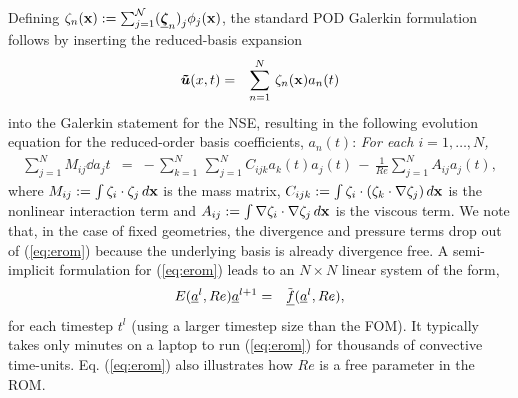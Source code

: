 Defining $\mathbf{\zeta}_n(\mathbf{x}) := \sum_{j=1}^{{\cal N}} (\mbox{\boldmath $ \underline \zeta $}_n)^{}_j \phi_j(\mathbf{x})$, 
the standard POD Galerkin formulation follows by inserting the reduced-basis
expansion
\\[-6.5ex]
\begin{eqnarray} \nonumber
{\mbox{\boldmath $ \tilde u $}}(x,t) &=& \sum_{n=1}^N \, \mathbf{\zeta}_n(\mathbf{x}) a_n(t)  \\[-3.3ex] \nonumber
\end{eqnarray}
into the Galerkin statement for the NSE, resulting in the following
evolution equation for the reduced-order basis coefficients, $a_n(t)$:
{\em For each $i=1,\dots,N$,} \\[-3.3ex]
\begin{eqnarray} \label{eq:erom}
\sum_{j=1}^N M_{ij} \dd{a_j}{t} &=&
- \, \sum_{k=1}^N \, \sum_{j=1}^N C_{ijk} a_k(t) a_j(t) 
\,-\, \frac{1}{Re} \sum_{j=1}^N A_{ij} a_j(t),
\end{eqnarray}
where 
$M_{ij} := \int \mathbf{\zeta}_i \cdot \mathbf{\zeta}_j  \, d\mathbf{x}$ is the mass matrix,
$C_{ijk} := \int \mathbf{\zeta}_i \cdot ( \mathbf{\zeta}_k \cdot \nabla \mathbf{\zeta}_j) \, d\mathbf{x}$
is the nonlinear interaction term and 
$A_{ij} := \int \nabla \mathbf{\zeta}_i \cdot \nabla \mathbf{\zeta}_j \, d\mathbf{x}$
is the viscous term.  We note that, in the case of fixed geometries, 
the divergence and pressure terms drop out of (\ref{eq:erom}) because
the underlying basis is already divergence free.
   A semi-implicit formulation for (\ref{eq:erom}) leads to an $N \times N$
linear system of the form,
\begin{eqnarray} \label{eq:eromd}
E({\underline a}^l,Re) {\underline a}^{l+1} &=& {\tilde {\underline f}} ({\underline a}^l,Re),
\end{eqnarray}
for each timestep $t^l$ (using a larger timestep size than the FOM).
It typically takes only minutes on a laptop to run
(\ref{eq:erom}) for thousands of convective time-units.
Eq. (\ref{eq:erom}) also illustrates how $Re$ is a free parameter in the ROM.


